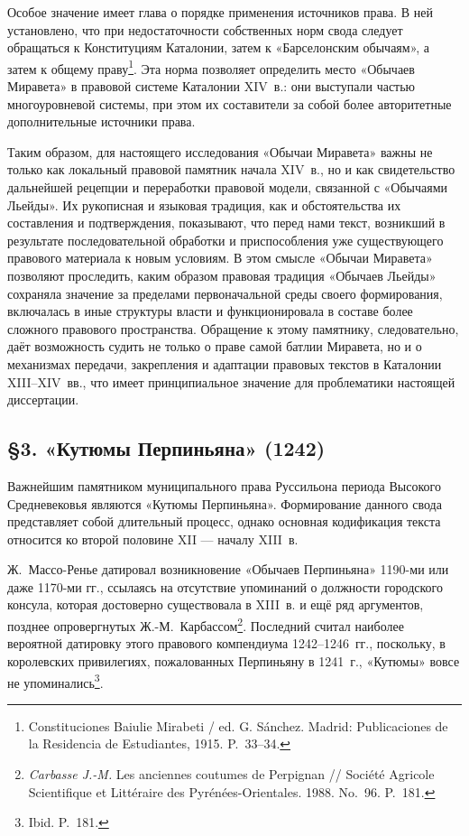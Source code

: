 Особое значение имеет глава о порядке применения источников права. В ней установлено, что при недостаточности собственных норм свода следует обращаться к Конституциям Каталонии, затем к «Барселонским обычаям», а затем к общему праву\footnote{Constituciones Baiulie Mirabeti / ed. G. Sánchez. Madrid: Publicaciones de la Residencia de Estudiantes, 1915. P.~33--34.}. Эта норма позволяет определить место «Обычаев Миравета» в правовой системе Каталонии XIV~в.: они выступали частью многоуровневой системы, при этом их составители за собой более авторитетные дополнительные источники права.

Таким образом, для настоящего исследования «Обычаи Миравета» важны не только как локальный правовой памятник начала XIV~в., но и как свидетельство дальнейшей рецепции и переработки правовой модели, связанной с «Обычаями Льейды». Их рукописная и языковая традиция, как и обстоятельства их составления и подтверждения, показывают, что перед нами текст, возникший в результате последовательной обработки и приспособления уже существующего правового материала к новым условиям. В этом смысле «Обычаи Миравета» позволяют проследить, каким образом правовая традиция «Обычаев Льейды» сохраняла значение за пределами первоначальной среды своего формирования, включалась в иные структуры власти и функционировала в составе более сложного правового пространства. Обращение к этому памятнику, следовательно, даёт возможность судить не только о праве самой батлии Миравета, но и о механизмах передачи, закрепления и адаптации правовых текстов в Каталонии XIII--XIV~вв., что имеет принципиальное значение для проблематики настоящей диссертации.

\subsection*{§3. «Кутюмы Перпиньяна» (1242)}

Важнейшим памятником муниципального права Руссильона периода Высокого Средневековья являются «Кутюмы Перпиньяна». Формирование данного свода представляет собой длительный процесс, однако основная кодификация текста относится ко второй половине XII --- началу XIII~в.

Ж.~Массо-Ренье датировал возникновение «Обычаев Перпиньяна» 1190-ми или даже 1170-ми гг., ссылаясь на отсутствие упоминаний о должности городского консула, которая достоверно существовала в XIII~в. и ещё ряд аргументов, позднее опровергнутых Ж.-М.~Карбассом\footnote{\emph{ Carbasse J.-M. }Les anciennes coutumes de Perpignan // Société Agricole Scientifique et Littéraire des Pyrénées-Orientales. 1988. No.~96. P.~181.}. Последний считал наиболее вероятной датировку этого правового компендиума 1242--1246~гг., поскольку, в королевских привилегиях, пожалованных Перпиньяну в 1241~г., «Кутюмы» вовсе не упоминались\footnote{Ibid. P.~181.}.

